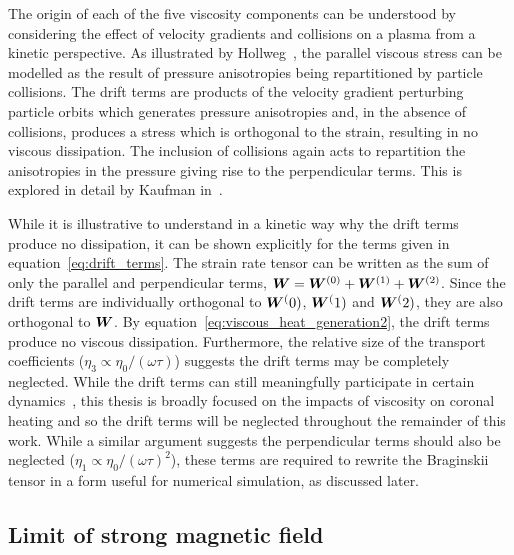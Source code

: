 The origin of each of the five viscosity components can be understood by considering the effect of velocity gradients and collisions on a plasma from a kinetic perspective. As illustrated by Hollweg~\cite{hollwegViscosityMagnetizedPlasma1985}, the parallel viscous stress can be modelled as the result of pressure anisotropies being repartitioned by particle collisions. The drift terms are products of the velocity gradient perturbing particle orbits which generates pressure anisotropies and, in the absence of collisions, produces a stress which is orthogonal to the strain, resulting in no viscous dissipation. The inclusion of collisions again acts to repartition the anisotropies in the pressure giving rise to the perpendicular terms. This is explored in detail by Kaufman in~\cite{kaufmanPlasmaViscosityMagnetic1960}.

While it is illustrative to understand in a kinetic way why the drift terms produce no dissipation, it can be shown explicitly for the terms given in equation~\ref{eq:drift_terms}. The strain rate tensor can be written as the sum of only the parallel and perpendicular terms, ${\bm W} = {\bm W}^{(0)} + {\bm W}^{(1)} + {\bm W}^{(2)}$. Since the drift terms are individually orthogonal to ${\bm W}^(0)$, ${\bm W}^(1)$ and ${\bm W}^(2)$, they are also orthogonal to ${\bm W}$. By equation~\ref{eq:viscous_heat_generation2}, the drift terms produce no viscous dissipation. Furthermore, the relative size of the transport coefficients ($\eta_3 \propto \eta_0/(\omega\tau)$) suggests the drift terms may be completely neglected. While the drift terms can still meaningfully participate in certain dynamics~\cite{dellarPlanarChannelFlow2011,ferraroFiniteElementImplementation2006}, this thesis is broadly focused on the impacts of viscosity on coronal heating and so the drift terms will be neglected throughout the remainder of this work. While a similar argument suggests the perpendicular terms should also be neglected ($\eta_1 \propto \eta_0/(\omega\tau)^2$), these terms are required to rewrite the Braginskii tensor in a form useful for numerical simulation, as discussed later.


\subsection{Limit of strong magnetic field}


